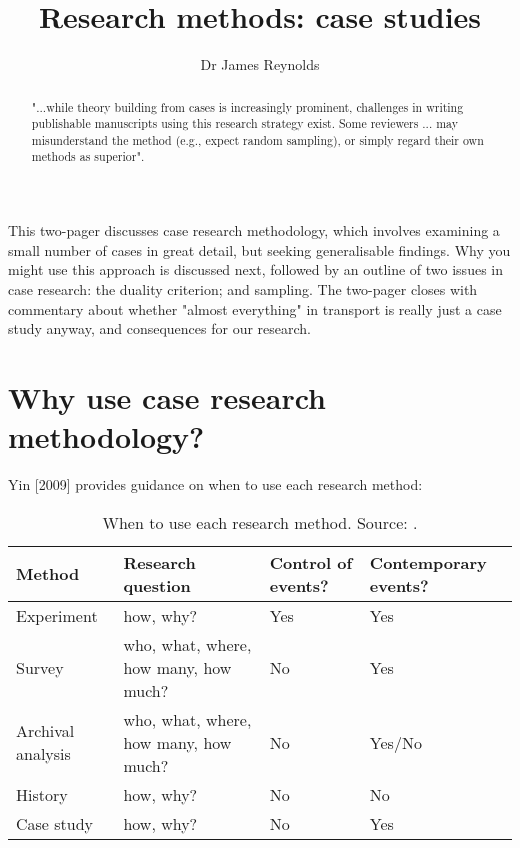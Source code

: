 \documentclass{tufte-handout}
\title{Research methods: case studies}
\author{Dr James Reynolds}
\begin{document}
\maketitle%

\begin{abstract}
\noindent
"...while theory building from cases is increasingly prominent, challenges in writing publishable manuscripts using this research strategy exist.  Some reviewers ... may misunderstand the method (e.g., expect random sampling), or simply regard their own methods as superior"\cite{Eisenhardt2007TBfC}.
\end{abstract}


This two-pager 
discusses case research methodology, 
which involves 
examining a small number of cases 
in great detail, 
but seeking generalisable findings\cite{Yin2009aa, Barrat2011aa, Ketokivi2014aa}. 
Why you might use this approach 
 is discussed next, 
 followed by 
 an outline of 
 two issues in case research: 
 the duality criterion; 
 and sampling. 
 The two-pager closes with 
 commentary about 
 whether "almost everything" in transport is really just a case study anyway, 
 and consequences for our research.

\section{Why use case research methodology?} 

Yin [2009] provides guidance on when to use each research method:

\begin{table*}[ht]
  \centering
  \selectfont
  \begin{tabular}{llll}
    \toprule
    Method & Research question & Control of events? & Contemporary events? \\
    \midrule
    Experiment & how, why? & Yes & Yes \\
    Survey & who, what, where, how many, how much? & No & Yes \\
    Archival analysis & who, what, where, how many, how much? & No & Yes/No \\
    History & how, why? & No & No \\
    Case study & how, why? & No & Yes \\
    \bottomrule
  \end{tabular}
  \caption{When to use each research method. Source: \citet{Yin2009aa}.}
  \label{tab:when_where}
\end{table*}
\end{document}
